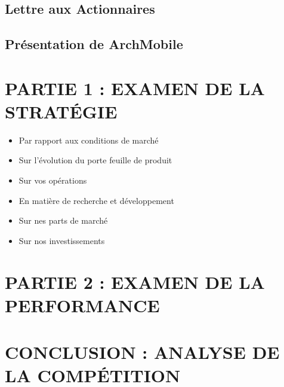 \documentclass[a4paper, 12pt]{article}
\begin{document}
\subsection{Lettre aux Actionnaires}

\subsection{Présentation de ArchMobile}


\pagebreak

\section{PARTIE 1 : EXAMEN DE LA STRATÉGIE}
\begin{itemize}
\item Par rapport aux conditions de marché
\item Sur l'évolution du porte feuille de produit
\item Sur vos opérations
\item En matière de recherche et développement
\item Sur nes parts de marché
\item Sur nos investissements
\end{itemize}


\pagebreak

\section{PARTIE 2 : EXAMEN DE LA PERFORMANCE}


\pagebreak
\section{CONCLUSION : ANALYSE DE LA COMPÉTITION}

\end{document}
